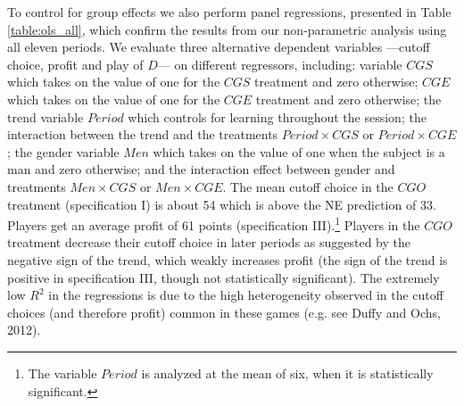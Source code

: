 \documentclass[11pt, letterpaper]{article}
\theoremstyle{plain}
\begin{document}
To control for group effects we also perform panel regressions, presented in Table \ref{table:ols_all}, which confirm the results from our non-parametric analysis using all eleven periods. We evaluate three alternative dependent variables ---cutoff choice, profit and play of $D$---  on different regressors, including: variable $CGS$ which takes on the value of one for the $CGS$ treatment and zero otherwise; $CGE$ which takes on the value of one for the $CGE$ treatment and zero otherwise; the trend variable $Period$ which controls for learning throughout the session; the interaction between the trend and the treatments $Period \times CGS$ or $Period \times CGE$; the gender variable $Men$ which takes on the value of one when the subject is a man and zero otherwise; and the interaction effect between gender and treatments $Men \times CGS$ or $Men \times CGE$. The mean cutoff choice in the $CGO$ treatment (specification I) is about 54 which is above the NE prediction of 33. Players get an average profit of 61 points (specification III).\footnote{The variable $Period$ is analyzed at the mean of six, when it is statistically significant.} Players in the $CGO$ treatment decrease their cutoff choice in later periods as suggested by the negative sign of the trend, which weakly increases profit (the sign of the trend is positive in specification III, though not statistically significant). The extremely low $R^2$ in the regressions is due to the high heterogeneity observed in the cutoff choices (and therefore profit) common in these games (e.g. see Duffy and Ochs, 2012).\\
\end{document}
